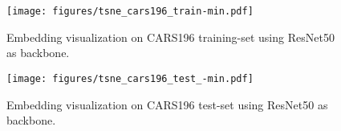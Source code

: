 \begin{figure}[ht!]
\centering
\texttt{[image: figures/tsne\_cars196\_train-min.pdf]}
\caption{Embedding visualization on CARS196 training-set using ResNet50 as backbone.}
\label{fig:cars196TrainTSNE}
\end{figure}

\newpage
\begin{figure}[ht!]
\centering
\texttt{[image: figures/tsne\_cars196\_test\_-min.pdf]}
\caption{Embedding visualization on CARS196 test-set using ResNet50 as backbone.}
\label{fig:cars196TestTSNE}
\end{figure}